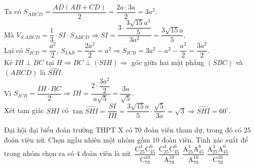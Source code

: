 \begin{ex}
{{
}\noindent
Ta có $ S_{ABCD}=\dfrac{AD(AB+CD)}{2}=\dfrac{2a\cdot 3a}{2}=3a^{2} $.\\
Mà $ V_{S.ABCD}=\dfrac{1}{3}\cdot SI\cdot S_{ABCD}\Rightarrow SI=\dfrac{3\cdot\dfrac{3\sqrt{15}a^{3}}{5} }{3a^{2}}=\dfrac{3\sqrt{15}a}{5} $.\\
Lại có $ S_{ICD}=\dfrac{a^{2}}{2} $, $ S_{IAB}=\dfrac{2a^{2}}{2}=a^{2}\Rightarrow  S_{ICB}=3a^{2}-a^{2}-\dfrac{a^{2}}{2}=\dfrac{3a^{2}}{2} $.\\
Kẻ $ IH\perp BC $ tại $ H\Rightarrow BC\perp (SIH)\Rightarrow $ góc giữa hai mặt phẳng $ (SBC) $ và $ (ABCD) $ là $ \widehat{SHI} $.\\
Vì $ S_{ICB}=\dfrac{IH\cdot BC}{2}\Rightarrow IH=\dfrac{2\cdot \dfrac{3a^{2}}{2}}{a\sqrt{5}}=\dfrac{3a}{\sqrt{5}} $.\\
Xét tam giác $ SHI $ có $ \tan\widehat{SHI}=\dfrac{SI}{IH}=\dfrac{3\sqrt{15}a}{5}\cdot \dfrac{\sqrt{5}}{3a}=\sqrt{3}\Rightarrow \widehat{SHI}=60^{\circ} $.
}
\end{ex}
\begin{ex}%
	Đại hội đại biểu đoàn trường THPT X có $ 70 $ đoàn viên tham dự, trong đó có $ 25 $ đoàn viên nữ. Chọn ngẫu nhiên một nhóm gồm $ 10 $ đoàn viên. Tính xác suất để trong nhóm chọn ra có $ 4 $ đoàn viên là nữ.
	\choice
	{\True $ \dfrac{\mathrm{C}_{25}^{4}\mathrm{C}_{45}^{6}}{\mathrm{C}_{70}^{10}} $}
	{$ \dfrac{\mathrm{C}_{25}^{4}\mathrm{C}_{45}^{6}}{\mathrm{A}_{70}^{10}} $}
	{$ \dfrac{\mathrm{A}_{25}^{4}\mathrm{A}_{45}^{6}}{\mathrm{A}_{70}^{10}} $}
	{$ \dfrac{\mathrm{A}_{25}^{4}\mathrm{A}_{45}^{6}}{\mathrm{C}_{70}^{10}} $}
\end{ex}

